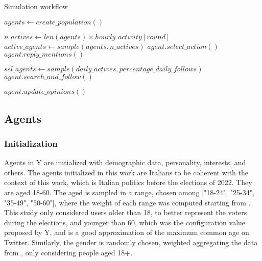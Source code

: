 \begin{algorithm}
\caption{Simulation workflow}
\label{alg:workflow}
\begin{algorithmic}[1]
\STATE $agents \gets create\_population()$

        \STATE $n\_actives \gets len(agents) \times hourly\_activity[round]$
        \STATE $active\_agents \gets sample(agents, n\_actives)$ 
            \STATE $agent.select\_action()$
            \STATE $agent.reply\_mentions()$
        \ENDFOR
    \ENDFOR

    \STATE $sel\_agents \gets sample(daily\_actives, percentage\_daily\_follows)$
        \STATE $agent.search\_and\_follow()$
    \ENDFOR

        \STATE $agent.update\_opinions()$
    \ENDFOR

\ENDFOR
\end{algorithmic}
\end{algorithm}



\subsection{Agents}
\subsubsection{Initialization}
Agents in Y are initialized with demographic data, personality, interests, and others.
The agents initialized in this work are Italians to be coherent with the context of this work, which is Italian politics before the elections of 2022.
They are aged 18-60. The aged is sampled in a range, chosen among ["18-24", "25-34", "35-49", "50-60"], where the weight of each range was computed starting from \cite{statista2024twitter}. This study only considered users older than 18, to better represent the voters during the elections, and younger than 60, which was the configuration value proposed by Y, and is a good approximation of the maximum common age on Twitter.
Similarly, the gender is randomly chosen, weighted aggregating the data from \cite{statista2024twitter}, only considering people aged 18+.

